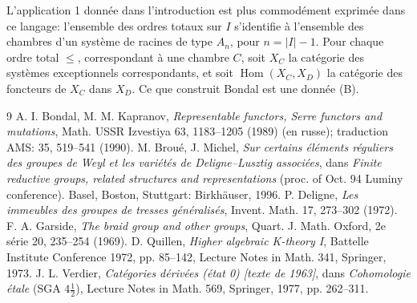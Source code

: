 \documentclass[11pt]{article}
\newcommand{\Hom}{\operatorname{Hom}}
\begin{document}
L'application 1 donnée dans l'introduction est plus commodément exprimée dans ce langage: l'ensemble des ordres totaux sur $I$ s'identifie à l'ensemble des chambres d'un système de racines de type $A_n$, pour $n=|I|-1$. Pour chaque ordre total $\leq$, correspondant à une chambre $C$, soit $X_C$ la catégorie des systèmes exceptionnels correspondants, et soit $\Hom(X_C,X_D)$ la catégorie des foncteurs de $X_C$ dans $X_D$. Ce que construit Bondal est une donnée (B).

\begin{thebibliography}{9}
 A. I. Bondal, M. M. Kapranov, \emph{Representable functors, Serre functors and mutations}, Math. USSR Izvestiya 63, 1183--1205 (1989) (en russe); traduction AMS: 35, 519--541 (1990).
 M. Broué, J. Michel, \emph{Sur certains éléments réguliers des groupes de Weyl et les variétés de Deligne--Lusztig associées}, dans \emph{Finite reductive groups, related structures and representations} (proc. of Oct. 94 Luminy conference). Basel, Boston, Stuttgart: Birkhäuser, 1996.
 P. Deligne, \emph{Les immeubles des groupes de tresses généralisés}, Invent. Math. 17, 273--302 (1972).
 F. A. Garside, \emph{The braid group and other groups}, Quart. J. Math. Oxford, 2e série 20, 235--254 (1969).
 D. Quillen, \emph{Higher algebraic K-theory I}, Battelle Institute Conference 1972, pp. 85--142, Lecture Notes in Math. 341, Springer, 1973.
 J. L. Verdier, \emph{Catégories dérivées (état 0) [texte de 1963]}, dans \emph{Cohomologie étale} (SGA $4\frac12$), Lecture Notes in Math. 569, Springer, 1977, pp. 262--311.
\end{thebibliography}
\end{document}
